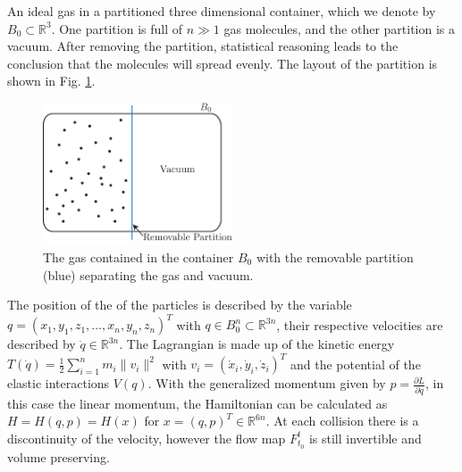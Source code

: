 \begin{ex}
	An ideal gas in a partitioned three dimensional container, which we denote by $B_0\subset \mathbb{R}^3$. One partition is full of $n \gg 1$ gas molecules, and the other partition is a vacuum. After removing the partition, statistical reasoning leads to the conclusion that the molecules will spread evenly. The layout of the partition is shown in Fig. \ref{fig:partitioned_gas}.
\begin{figure}[h!]
	\centering
	\includegraphics[width=0.5\textwidth]{figures/ch8/14partitioned_container.pdf}
	\caption{The gas contained in the container $B_0$ with the removable partition (blue) separating the gas and vacuum.}
	\label{fig:partitioned_gas}
\end{figure}
The position of the  of the particles is described by the variable $q=(x_1, y_1, z_1, \ldots, x_n, y_n, z_n)^{T}$ with $q\in B_0^{n} \subset \mathbb{R}^{3n}$, their respective velocities are described by $\dot{q}\in \mathbb{R}^{3n}$. The Lagrangian is made up of the kinetic energy $T(\dot{q}) = \frac{1}{2}\sum_{i=1}^{n}m_i \|v_i\|^{2} $ with $v_i = (\dot{x}_i, \dot{y}_i, \dot{z}_i)^{T}$ and the potential of the elastic interactions $V(q)$. With the generalized momentum given by $p=\frac{\partial L}{\partial \dot{q}} $, in this case the linear momentum, the Hamiltonian can be calculated as $H=H(q,p)=H(x) $ for $x= (q,p)^{T}\in \mathbb{R}^{6n}$. At each collision there is a discontinuity of the velocity, however the flow map $F_{t_0}^{t}$ is still invertible and volume preserving.


\end{ex}
